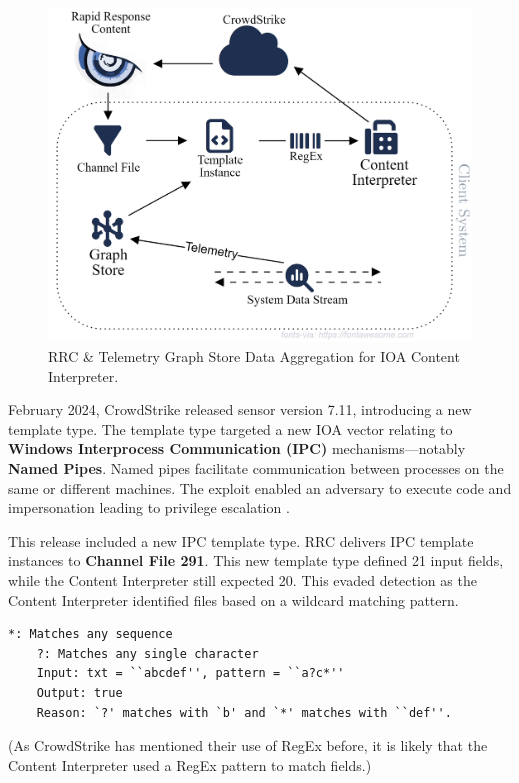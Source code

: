 \begin{enumerate}
          \begin{figure}[h!]
              \centering
              \includegraphics[width=.65\textwidth]{Sections/crowd/rrc.png}
              \caption{RRC \& Telemetry Graph Store Data Aggregation for IOA Content Interpreter.}
              \label{fig:channelfile}
          \end{figure}
\end{enumerate}

\vspace{-1em}
February 2024, CrowdStrike released sensor version 7.11, introducing a new template type.
The template type targeted a new IOA vector relating to \textbf{Windows Interprocess Communication (IPC)} mechanisms---notably \textbf{Named Pipes}.
Named pipes facilitate communication between processes on the same or different machines.
The exploit enabled an adversary to execute code and impersonation leading to privilege escalation \cite{sandker_named_pipes_2021}.

This release included a new IPC template type. RRC delivers IPC template instances to \textbf{Channel File 291}. This
new template type defined 21 input fields, while the Content Interpreter still expected 20. This evaded detection
as the Content Interpreter identified files based on a wildcard matching pattern.

\begin{lstlisting}[caption=Wildcard Pattern Matching Example]
    *: Matches any sequence 
    ?: Matches any single character
    Input: txt = ``abcdef'', pattern = ``a?c*''
    Output: true
    Reason: `?' matches with `b' and `*' matches with ``def''.
\end{lstlisting}

\noindent
(As CrowdStrike has mentioned their use of RegEx before, it is likely that the Content Interpreter used a RegEx pattern to match fields.)

